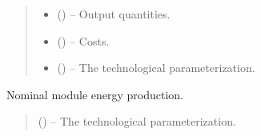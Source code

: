 \documentclass[letterpaper,10pt,english]{sphinxmanual}
\begin{document}
\begin{fulllineitems}
\begin{quote}
\begin{description}
\begin{itemize}
\item {} 
\sphinxAtStartPar
{} () – Output quantities.

\item {} 
\sphinxAtStartPar
{} () – Costs.

\item {} 
\sphinxAtStartPar
{} () – The technological parameterization.

\end{itemize}

\end{description}\end{quote}

\end{fulllineitems}


\begin{fulllineitems}
\label{\detokenize{technology:technology.pv_residential_large.module_power}}
\pysigstartsignatures
{}
\pysigstopsignatures
\sphinxAtStartPar
Nominal module energy production.
\begin{quote}\begin{description}
\sphinxAtStartPar
{} () – The technological parameterization.

\end{description}\end{quote}

\end{fulllineitems}

\end{document}
